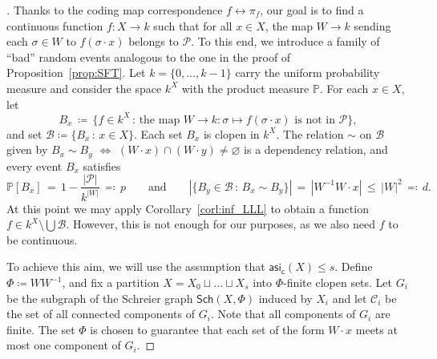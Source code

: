 \documentclass[11pt,reqno,psamsfonts]{amsart}
\theoremstyle{bfnote}
\theoremstyle{definition}
\theoremstyle{remark}
\newcommand{\0}{\varnothing}
\newcommand{\set}[1]{\{#1\}}
\renewcommand{\P}{\mathbb{P}}
\renewcommand{\leq}{\leqslant}
\newcommand{\defeq}{\coloneqq}
\newcommand{\asi}{\mathsf{asi}}
\newcommand{\casi}{\asi_{\mathsf{c}}}
\newcommand{\Sch}{\mathsf{Sch}}
\numberwithin{equation}{section}
\newenvironment{scproof}[1][]{\begin{proof}[\textsc{\upshape{Proof}}#1]}{\end{proof}}
\begin{document}
    \begin{scproof}
        

        
        Thanks to the coding map correspondence $f \longleftrightarrow \pi_f$, our goal is to find a continuous function $f \colon X \to k$ such that for all $x \in X$, the map $W \to k$ sending each $\sigma \in W$ to $f(\sigma \cdot x)$ belongs to $\mathcal{P}$. To this end, we introduce a family of ``bad'' random events analogous to the one in the proof of Proposition~\ref{prop:SFT}. Let $k = \set{0,\ldots, k-1}$ carry the uniform probability measure and consider the %
        space $k^X$ with the product measure $\P$. For each $x \in X$, let %
        \[
            B_x \,\defeq\, \big\{f \in k^X \,:\, \text{the map $W \to k \colon \sigma \mapsto f(\sigma \cdot x)$ is not in $\mathcal{P}$}\big\},
        \]
        and set $\mathcal{B} \defeq \set{B_x \,:\, x \in X}$. Each set $B_x$ is clopen in $k^X$. The relation $\sim$ on $\mathcal{B}$ given by $B_x \sim B_y$ $\Longleftrightarrow$ $(W \cdot x) \cap (W \cdot y) \neq \0$ is a dependency relation, and every event $B_x$ satisfies
        \[
            \P[B_x] \,=\, 1 - \frac{|\mathcal{P}|}{k^{|W|}} \,\eqqcolon\, p \qquad \text{and} \qquad |\set{B_{y} \in \mathcal{B} \,:\, B_x \sim B_{y}}| \,=\, |W^{-1}W \cdot x| \,\leq\, |W|^2 \,\eqqcolon\, d.
        \]
        At this point we may apply Corollary~\ref{corl:inf_LLL} to obtain a function $f \in k^X \setminus \bigcup \mathcal{B}$. However, this is not enough for our purposes, as we also need $f$ to be {continuous}.

        To achieve this aim, we will use the assumption that $\casi(X) \leq s$. Define $\Phi \defeq WW^{-1}$, and fix a partition $X = X_0 \sqcup \ldots \sqcup X_s$ into $\Phi$-finite clopen sets. Let $G_i$ be the subgraph of the Schreier graph $\Sch(X,\Phi)$ induced by $X_i$ and let $\mathcal{C}_i$ be the set of all connected components of $G_i$. Note that all components of $G_i$ are finite. The set $\Phi$ is chosen to guarantee that each set of the form $W \cdot x$ meets at most one component of $G_i$.
        

\end{scproof}
\end{document}
